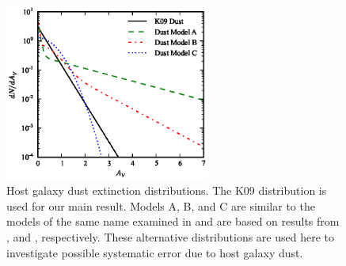 \begin{figure}
\includegraphics[width=0.6\textwidth]{figures/fieldrate/extinctiondist.eps}
\caption[Dust extinction distributions used in field rate
  calculation]{Host galaxy dust extinction distributions. The K09
  distribution is used for our main result. Models A, B, and C are
  similar to the models of the same name examined in \citet{dahlen08a}
  and are based on results from \citet{hatano98a}, \citet{riello05a}
  and \citet{neill06a}, respectively. These alternative distributions
  are used here to investigate possible systematic error due to host
  galaxy dust.\label{fig:extinction}}
\end{figure}


